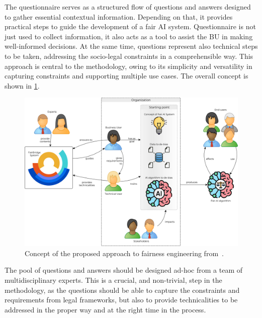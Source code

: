 \documentclass[12pt,a4paper,openright,twoside]{book}
\begin{document}
The questionnaire serves as a structured flow of questions and answers designed to gather essential contextual information. Depending on that, it provides practical steps to guide the development of a fair \ac{AI} system.
%
Questionnaire is not just used to collect information, it also acts as a tool to assist the \ac{BU} in making well-informed decisions. At the same time, questions represent also technical steps to be taken, addressing the socio-legal constraints in a comprehensible way.
%
This approach is central to the methodology, owing to its simplicity and versatility in capturing constraints and supporting multiple use cases.
%
The overall concept is shown in \cref{fig:concept}.

\begin{figure}
    \centering
    \includegraphics[width=0.88\linewidth]{figures/concept.pdf}
    \caption{Concept of the proposed approach to fairness engineering from~\cite{hicssfairness2025}.}
    \label{fig:concept}
\end{figure}

The pool of questions and answers should be designed ad-hoc from a team of multidisciplinary experts. 
%
This is a crucial, and non-trivial, step in the methodology, as the questions should be able to capture the constraints and requirements from legal frameworks, but also to provide technicalities to be addressed in the proper way and at the right time in the process.
\end{document}
